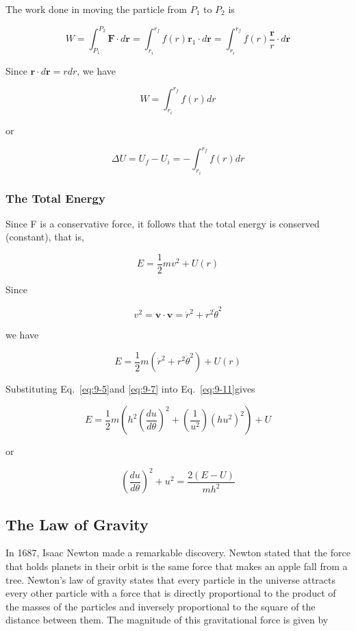 \documentclass[10pt]{article}
\numberwithin{equation}{section}
\begin{document}
The work done in moving the particle from $P_{1}$ to $P_{2}$ is

$$
W=\int_{P_{1}}^{P_{2}} \mathbf{F} \cdot d \mathbf{r}=\int_{r_{i}}^{r_{f}} f(r) \mathbf{r}_{1} \cdot d \mathbf{r}=\int_{r_{i}}^{r_{f}} f(r) \frac{\mathbf{r}}{r} \cdot d \mathbf{r}
$$

Since $\mathbf{r} \cdot d \mathbf{r}=r d r$, we have

$$
W=\int_{r_{i}}^{r_{f}} f(r) d r
$$

or


\begin{equation}
\Delta U=U_{f}-U_{i}=-\int_{r_{i}}^{r_{f}} f(r) d r \label{eq:9-10}
\end{equation}


\subsubsection{The Total Energy}\label{sec:9-1-4}
Since F is a conservative force, it follows that the total energy is conserved (constant), that is,

$$
E=\frac{1}{2} m v^{2}+U(r)
$$

Since

$$
v^{2}=\mathbf{v} \cdot \mathbf{v}=\dot{r}^{2}+r^{2} \dot{\theta}^{2}
$$

we have


\begin{equation}
E=\frac{1}{2} m\left(\dot{r}^{2}+r^{2} \dot{\theta}^{2}\right)+U(r) \label{eq:9-11}
\end{equation}


Substituting Eq.~\eqref{eq:9-5}and \eqref{eq:9-7} into Eq.~\eqref{eq:9-11}gives

$$
E=\frac{1}{2} m\left(h^{2}\left(\frac{d u}{d \theta}\right)^{2}+\left(\frac{1}{u^{2}}\right)\left(h u^{2}\right)^{2}\right)+U
$$

or


\begin{equation}
\left(\frac{d u}{d \theta}\right)^{2}+u^{2}=\frac{2(E-U)}{m h^{2}} \label{eq:9-12}
\end{equation}


\subsection{The Law of Gravity}\label{sec:9-2}
In 1687, Isaac Newton made a remarkable discovery. Newton stated that the force that holds planets in their orbit is the same force that makes an apple fall from a tree. Newton's law of gravity states that every particle in the universe attracts every other particle with a force that is directly proportional to the product of the masses of the particles and inversely proportional to the square of the distance between them. The magnitude of this gravitational force is given by
\end{document}
